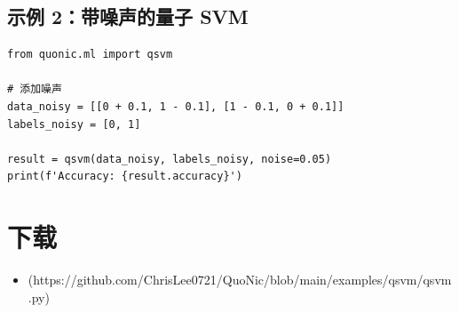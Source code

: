 \documentclass[12pt,a4paper]{article}
\begin{document}
\subsection{示例 2：带噪声的量子 SVM}

\begin{verbatim}
from quonic.ml import qsvm

# 添加噪声
data_noisy = [[0 + 0.1, 1 - 0.1], [1 - 0.1, 0 + 0.1]]
labels_noisy = [0, 1]

result = qsvm(data_noisy, labels_noisy, noise=0.05)
print(f'Accuracy: {result.accuracy}')
\end{verbatim}

\section{下载}

\begin{itemize}
  \item [qsvm.py](https://github.com/ChrisLee0721/QuoNic/blob/main/examples/qsvm/qsvm.py)
\end{itemize}
\end{document}
